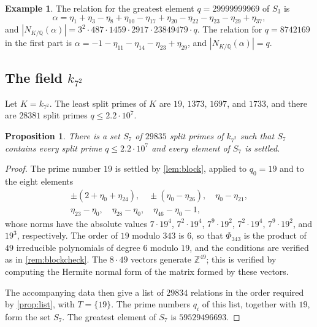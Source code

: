 \documentclass[11pt]{amsart}
\theoremstyle{plain}
\newtheorem{proposition}[theorem]{Proposition}
\theoremstyle{definition}
\newtheorem{example}[theorem]{Example}
\begin{document}
\begin{example} \label{ex:relations}
The relation for the greatest element $q = 29999999969$ of $S_3$ is
\[
\alpha = \eta_1 + \eta_3 - \eta_8 + \eta_{10} - \eta_{17} + \eta_{20} - \eta_{22} - \eta_{23} - \eta_{29} + \eta_{37},
\]
and $|N_{K/\mathbb{Q}}(\alpha)| = 3^2 \cdot 487 \cdot 1459 \cdot 2917 \cdot 23849479 \cdot q$.
The relation for $q = 8742169$ in the first part is $\alpha = -1 - \eta_{11} - \eta_{14} - \eta_{23} + \eta_{29}$, and $|N_{K/\mathbb{Q}}(\alpha)| = q$.
\end{example}

\subsection{The field $k_{7^2}$}

Let $K = k_{7^2}$.
The least split primes of $K$ are $19$, $1373$, $1697$, and $1733$, and there are $28381$ split primes $q \le 2.2 \cdot 10^7$.

\begin{proposition} \label{prop:data7}
There is a set $S_7$ of $29835$ split primes of $k_{7^2}$ such that $S_7$ contains every split prime $q \le 2.2 \cdot 10^7$ and every element of $S_7$ is settled.
\end{proposition}

\begin{proof}
The prime number $19$ is settled by \cref{lem:block}, applied to $q_0 = 19$ and to the eight elements
\begin{gather*}
\pm(2 + \eta_0 + \eta_{24}), \quad \pm(\eta_0 - \eta_{26}), \quad \eta_0 - \eta_{21}, \\
\eta_{23} - \eta_0, \quad \eta_{28} - \eta_0, \quad \eta_{46} - \eta_0 - 1,
\end{gather*}
whose norms have the absolute values $7 \cdot 19^4$, $7^2 \cdot 19^4$, $7^9 \cdot 19^2$, $7^2 \cdot 19^4$, $7^9 \cdot 19^2$, and $19^3$, respectively.
The order of $19$ modulo $343$ is $6$, so that $\Phi_{343}$ is the product of $49$ irreducible polynomials of degree $6$ modulo $19$, and the conditions are verified as in \cref{rem:blockcheck}.
The $8 \cdot 49$ vectors generate $\mathbb{Z}^{49}$; this is verified by computing the Hermite normal form of the matrix formed by these vectors.

The accompanying data then give a list of $29834$ relations in the order required by \cref{prop:list}, with $T = \{19\}$.
The prime numbers $q_i$ of this list, together with $19$, form the set $S_7$.
The greatest element of $S_7$ is $59529496693$.
\end{proof}
\end{document}
